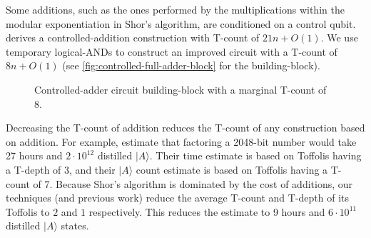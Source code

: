 \documentclass[twocolumn,longbibliography]{quantumarticle-customized}
\begin{document}
Some additions, such as the ones performed by the multiplications within the modular exponentiation in Shor's algorithm, are conditioned on a control qubit.
\cite{Coreas2017} derives a controlled-addition construction with T-count of $21n + O(1)$.
We use temporary logical-ANDs to construct an improved circuit with a T-count of $8n + O(1)$ (see \autoref{fig:controlled-full-adder-block} for the building-block).

\begin{figure}
  \caption{
	Controlled-adder circuit building-block with a marginal T-count of 8.
  }
  \label{fig:controlled-full-adder-block}
\end{figure}

Decreasing the T-count of addition reduces the T-count of any construction based on addition.
For example, \cite{Fowler2012} estimate that factoring a 2048-bit number would take 27 hours and $2 \cdot 10^{12}$ distilled $|A\rangle$.
Their time estimate is based on Toffolis having a T-depth of 3, and their $|A\rangle$ count estimate is based on Toffolis having a T-count of 7.
Because Shor's algorithm is dominated by the cost of additions, our techniques (and previous work) reduce the average T-count and T-depth of its Toffolis to $2$ and $1$ respectively.
This reduces the estimate to 9 hours and $6 \cdot 10^{11}$ distilled $|A\rangle$ states.
\end{document}
